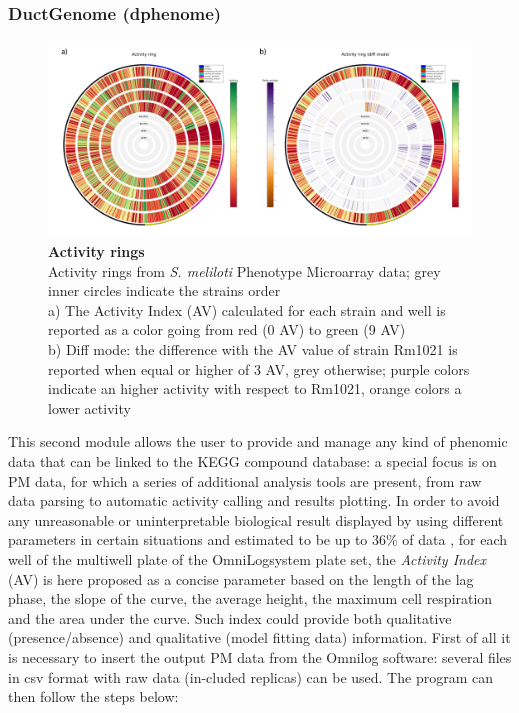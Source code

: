 \subsubsection{DuctGenome (dphenome)}
\begin{figure}
	\center
    \includegraphics[width=1\textwidth]{figures/2/thesis_21a}
	\caption{\label{fig:drings}\textbf{Activity rings}\\
			Activity rings from \textit{S. meliloti} Phenotype Microarray data; grey inner circles indicate the strains order\\
			a) The Activity Index (AV) calculated for each strain and well is reported as a color going from red (0 AV) to green (9 AV)\\
			b) Diff mode: the difference with the AV value of strain Rm1021 is reported when equal or higher of 3 AV, grey otherwise; purple colors indicate an higher activity with respect to Rm1021, orange colors a lower activity}
\end{figure}

This second module allows the user to provide and manage any kind of phenomic data that can be linked to the KEGG compound database: a special focus is on PM data, for which a series of additional analysis tools are present, from raw data parsing to automatic activity calling and results plotting. In order to avoid any unreasonable or uninterpretable biological result displayed by using different parameters in certain situations and estimated to be up to 36\% of data \cite{vaas2012visualization}, for each well of the multiwell plate of the OmniLog\texttrademark system plate set, the \textit{Activity Index} (AV) is here proposed as a concise parameter based on the length of the lag phase, the slope of the curve, the average height, the maximum cell respiration and the area under the curve. Such index could provide both qualitative (presence/absence) and qualitative (model fitting data) information. First of all it is necessary to insert the output PM data from the Omnilog software: several files in csv format with raw data (in-cluded replicas) can be used. The program can then follow the steps below:

